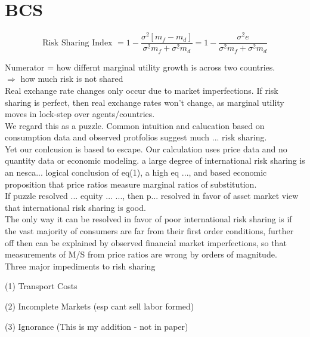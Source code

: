 \documentclass[]{article}
\begin{document}
\section*{BCS}
\begin{equation*}
\mbox{Risk Sharing Index }= 1-\frac{\sigma^2[m_f-m_d]}{\sigma^2m_f + \sigma^2m_d} = 1-\frac{\sigma^2e}{\sigma^2m_f + \sigma^2m_d}
\end{equation*}

Numerator = how differnt marginal utility growth is across two countries.\\
$\Rightarrow $ how much risk is not shared\\

Real exchange rate changes only occur due to market imperfections. If risk sharing is perfect, then real exchange rates won't change, as marginal utility moves in lock-step over agents/countries.\\

We regard this as a puzzle. Common intuition and calucation based on consumption data and observed protfolios suggest much ... risk sharing.\\

Yet our conlcusion is based to escape. Our calculation uses price data and no quantity data or economic modeling. a large degree of international risk sharing is an nesca... logical conclusion of eq(1), a high eq ..., and based economic proposition that price ratios measure marginal ratios of substitution.\\

If puzzle resolved ... equity ... ..., then p... resolved in favor of asset market view that international risk sharing is good.\\

The only way it can be resolved in favor of poor international risk sharing is if the vast majority of consumers are far from their first order conditions, further off then can be explained by observed financial market imperfections, so that measurements of M/S from price ratios are wrong by orders of magnitude.\\

Three major impediments to rish sharing
\begin{list}{ }{}
\item (1) Transport Costs
\item (2) Incomplete Markets (esp cant sell labor formed)
\item (3) Ignorance (This is my addition - not in paper)
\end{list}
\end{document}
